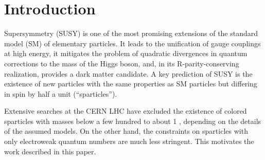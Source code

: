 \section{Introduction}
\label{sect:introduction}

Supersymmetry  (SUSY) \cite{Golfand:1971iw,Wess:1973kz,Wess:1974tw,Fayet1,Fayet2} is one of the most promising extensions of the 
standard model (SM) of elementary particles.  It leads to the unification of gauge couplings at
high energy, it mitigates the problem of quadratic divergences in quantum corrections to the
mass of the Higgs boson, and, in its R-parity-conserving realization, provides a dark matter candidate.
A key prediction of SUSY is the existence of new particles with the same properties as SM particles but
differing in spin by half a unit (``sparticles'').
%

Extensive searches at the CERN LHC have excluded the existence of colored sparticles with masses below a few hundred \GeV to about 1 \TeV,
depending on the details of the assumed models\cite{Chatrchyan:2012paa,Chatrchyan:2013xna,Chatrchyan:2013wxa,Chatrchyan:2013fea,Chatrchyan:2013mys,Chatrchyan:2014aea,Chatrchyan:2014lfa,Khachatryan:2015exa,Khachatryan:2015vra,Khachatryan:2015lwa}. %
On the other hand, the constraints on sparticles with only electroweak quantum numbers are much less stringent.  This motivates the
work described in this paper.

